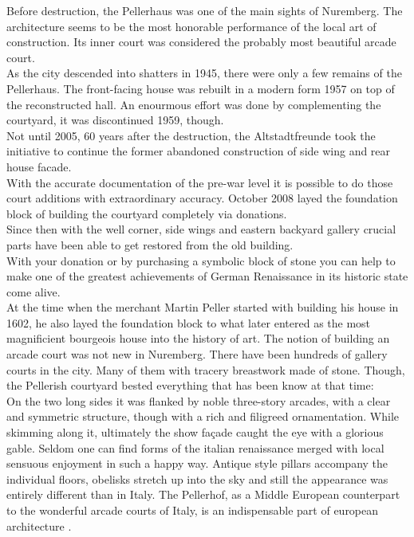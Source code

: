 Before destruction, the Pellerhaus was one of the main sights of Nuremberg. The architecture seems to be the most honorable performance of the local art of construction. Its inner court was considered the probably most beautiful arcade court.\\
As the city descended into shatters in 1945, there were only a few remains of the Pellerhaus. The front-facing house was rebuilt in a modern form 1957 on top of the reconstructed hall. An enourmous effort was done by complementing the courtyard, it was discontinued 1959, though.\\
Not until 2005, 60 years after the destruction, the Altstadtfreunde took the initiative to continue the former abandoned construction of side wing and rear house facade.\\
With the accurate documentation of the pre-war level it is possible to do those court additions with extraordinary accuracy. October 2008 layed the foundation block of building the courtyard completely via donations.\\
Since then with the well corner, side wings and eastern backyard gallery crucial parts have been able to get restored from the old building.\\
With your donation or by purchasing a symbolic block of stone you can help to make one of the greatest achievements of German Renaissance in its historic state come alive.\\
At the time when the merchant Martin Peller started with building his house in 1602, he also layed the foundation block to what later entered as the most magnificient bourgeois house into the history of art. The notion of building an arcade court was not new in Nuremberg. There have been hundreds of gallery courts in the city. Many of them with tracery breastwork made of stone. Though, the Pellerish courtyard bested everything that has been know at that time:\\
On the two long sides it was flanked by noble three-story arcades, with a clear and symmetric structure, though with a rich and filigreed ornamentation. While skimming along it, ultimately the show façade caught the eye with a glorious gable. Seldom one can find forms of the italian renaissance merged with local sensuous enjoyment in such a happy way. Antique style pillars accompany the individual floors, obelisks stretch up into the sky and still the appearance was entirely different than in Italy. The Pellerhof, as a Middle European counterpart to the wonderful arcade courts of Italy, is an indispensable part of european architecture \parencite[translated from German]{afWiederaufbauDesPellerhofes}.\\\\


